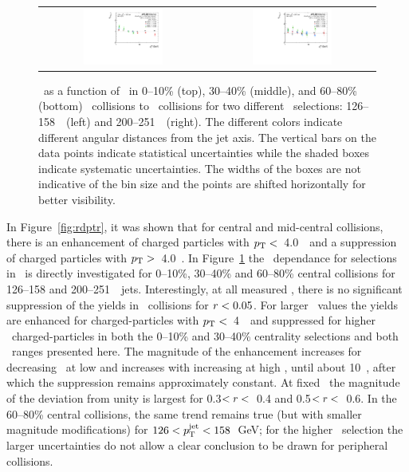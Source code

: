 \begin{figure}
{\begin{tabular}{cc}
	 \includegraphics[width=0.5\textwidth]{figures/main/results/RDpT_trkpt_jet7_cent5} &
	 \includegraphics[width=0.5\textwidth]{figures/main/results/RDpT_trkpt_jet9_cent5} \\
\end{tabular} }
   \caption{\RDptr\ as a function of \pt\ in  0--10\% (top), 30--40\% (middle), and 60--80\% (bottom) \PbPb\ collisions to \pp\ collisions for two different \ptjet\ selections: 126--158~\GeV\ (left) and 200--251~\GeV\ (right).
The different colors indicate different angular distances from the jet axis.
The vertical bars on the data points indicate statistical uncertainties while the shaded boxes indicate systematic uncertainties.
The widths of the boxes are not indicative of the bin size and the points are shifted horizontally for better visibility.}
      \label{fig:pttrkdep}
\end{figure}


In Figure~\ref{fig:rdptr}, it was shown that for central and mid-central collisions, there is an enhancement of
charged particles with $\mbox{$p_{\mathrm{T}}$} <$~4.0~\GeV\ and a suppression of charged particles with $\mbox{$p_{\mathrm{T}}$} >$~4.0~\GeV.
 In
Figure~\ref{fig:pttrkdep} 
the \pt\ dependance for selections in \rvar\ is directly investigated for 0--10\%, 30--40\% and 60--80\% central 
collisions for 126--158 and 200--251~\GeV\ jets.
Interestingly, at all measured \pt, there is no significant suppression of the yields in \pbpb\ collisions
for $\mbox{$r$} < 0.05$.
 For larger \rvar\ values the yields are enhanced for charged-particles with $\mbox{$p_{\mathrm{T}}$} <$~4~\GeV\ and 
suppressed for higher \pt\ charged-particles in both the 0--10\% and 30--40\% centrality selections and both \ptjet\ 
ranges presented here.
 The magnitude of the enhancement increases for decreasing \pt\ at low \pt and increases
with increasing \pt at high \pt, until about 10~\GeV, after which the suppression remains approximately constant.
At fixed \pt\ the magnitude of the deviation from unity is largest for 0.3$< \mbox{$r$} <$~0.4 and 0.5$< \mbox{$r$} <$~0.6.
In the 60--80\% central collisions, the same trend remains true (but with smaller magnitude 
modifications) for \mbox{$126 < \mbox{$p_{\mathrm{T}}^{\mathrm{jet}}$} < 158$ GeV}; for the higher \ptjet\ selection the larger uncertainties 
do not allow a clear conclusion to be drawn for peripheral collisions.

